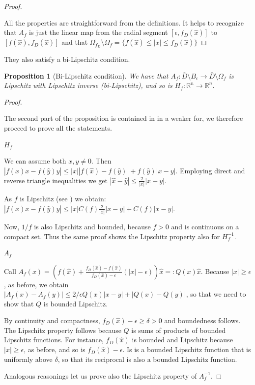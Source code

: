 \documentclass[english,a4paper,9pt,oneside]{scrbook}	%
\theoremstyle{break}
\newtheorem{prop}[equation]{Proposition}
\newenvironment{mproof}[1][\proofname]{%
  \begin{proof}[#1]$ $\par\nobreak\ignorespaces
}{%
  \end{proof}
}
\renewcommand*{\proofname}{Proof}
\theoremstyle{remark}
\newcommand{\mR}{\mathbb{R}}
\newcommand{\xh}{\hat{x}}
\newcommand{\yh}{\hat{y}}
\newcommand{\eps}{\epsilon}
\begin{document}
\begin{mproof}
All the properties are straightforward from the definitions. It helps to recognize that $A_f$ is just the linear map from the radial segment $[\eps, f_D(\xh)]$ to $[f(\xh), f_D(\xh)]$ and that $\overline{\Omega_{f_D}} \setminus \Omega_f = \{f(\xh)\leq|x|\leq f_D(\xh)\}$
\end{mproof}

They also satisfy a bi-Lipschitz condition.

\begin{prop}[Bi-Lipschitz condition]
We have that $A_f:  \overline{D}\setminus B_\eps\rightarrow \overline{D}\setminus \Omega_f $ is Lipschitz with Lipschitz inverse (bi-Lipschitz), and so is $H_f: \mR^n \rightarrow \mR^n$.
\end{prop}

\begin{mproof}

The second part of the proposition is contained in \cite{deckelnick} in a weaker for, we therefore proceed to prove all the statements.

\underline{$H_f$}

We can assume both $x,y\neq 0$. Then $|f(\xh)x-f(\yh)y|\leq |x||f(\xh)-f(\yh)|+f(\yh)|x-y|$. Employing direct and reverse triangle inequalities we get $|\xh-\yh|\leq \frac{2}{|x|}|x-y|$.

As $f$ is Lipschitz (see \cite{deckelnick}) we obtain:  $|f(\xh)x-f(\yh)y|\leq |x|C(f)\frac{2}{|x|}|x-y|+C(f)|x-y|$.

Now, $1/f$ is also Lipschitz and bounded, because $f>0$ and is continuous on a compact set. Thus the same proof shows the Lipschitz property also for $H_f^{-1}$.

\underline{$A_f$}

Call $A_f(x)=\left (  f(\xh)+\frac{f_D(\xh)-f(\xh)}{f_D(\xh)-\eps}(|x|-\eps) \right )\xh =:Q(x)\xh $. Because $|x|\geq\eps$, as before, we obtain $|A_f(x)-A_f(y)|\leq 2/\eps Q(x) |x-y|+|Q(x)-Q(y)|$, so that we need to show that $Q$ is bounded Lipschitz.

By continuity and compactness, $f_D(\xh)-\eps\geq \delta >0$ and boundedness follows. The Lipschitz property follows because $Q$ is sums of products of bounded Lipschitz functions. For instance, $f_D(\xh)$ is bounded and Lipschitz because $|x|\geq\eps$, as before, and so is $f_D(\xh)-\eps$. Is is a bounded Lipschitz function that is uniformly above $\delta$, so that its reciprocal is also a bounded Lipschitz function.

Analogous reasonings let us prove also the Lipschitz property of $A_f^{-1}$.

\end{mproof}
\end{document}

